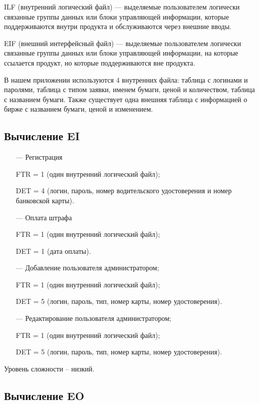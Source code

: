 ILF (внутренний логический файл) --- выделяемые пользователем логически связанные группы данных или блоки управляющей информации, которые поддерживаются внутри продукта и обслуживаются через внешние вводы.

EIF (внешний интерфейсный файл) --- выделяемые пользователем логически связанные группы данных или блоки управляющей информации, на которые ссылается продукт, но которые поддерживаются вне продукта.

В нашем приложении используются 4 внутренних файла: таблица с логинами и паролями, таблица с типом заявки, именем бумаги, ценой и количеством, таблица с названием бумаги. Также существует одна внешняя
таблица с информацией о бирже с названием бумаги, ценой и изменением.

\subsection*{Вычисление EI}
\begin{itemize}
    \item[---] Регистрация
    
    FTR = 1 (один внутренний логический файл);
    
    DET = 4 (логин, пароль, номер водительского удостоверения и номер банковской карты).
    
    \item[---] Оплата штрафа
    
    FTR = 1 (один внутренний логический файл);
    
    DET = 1 (дата оплаты).

    \item[---] Добавление пользователя администратором;
    
    FTR = 1 (один внутренний логический файл);
    
    DET = 5 (логин, пароль, тип, номер карты, номер удостоверения).

    \item[---] Редактирование пользователя администратором;
    
    FTR = 1 (один внутренний логический файл);
    
    DET = 5 (логин, пароль, тип, номер карты, номер удостоверения).
        
\end{itemize}

Уровень сложности – низкий.

\subsection*{Вычисление EO}

